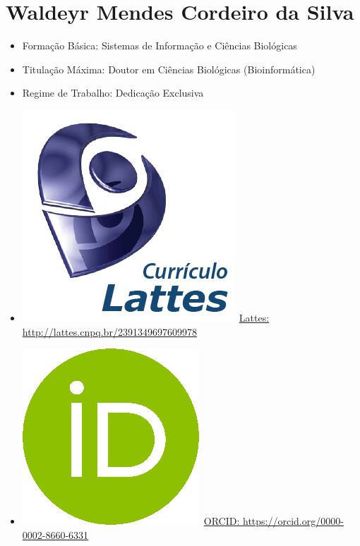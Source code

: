\documentclass[11pt,fleqn]{book} %
\begin{document}
\section{Waldeyr Mendes Cordeiro da Silva}\label{WaldeyrMendes}
\begin{itemize}
	\item Formação Básica: Sistemas de Informação e Ciências Biológicas 
	\item Titulação Máxima: Doutor em Ciências Biológicas (Bioinformática)
	\item Regime de Trabalho: Dedicação Exclusiva
	\item \includegraphics[scale=.03]{Pictures/lattes}~\href{http://lattes.cnpq.br/2391349697609978}{Lattes: http://lattes.cnpq.br/2391349697609978}
	\item \includegraphics[scale=.15]{Pictures/orcid}~\href{https://orcid.org/0000-0002-8660-6331}{ORCID: https://orcid.org/0000-0002-8660-6331}
\end{itemize}




%
\end{document}
